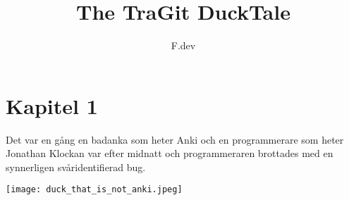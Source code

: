 \documentclass[a4paper]{article}
\begin{document}
\title{The TraGit DuckTale}
\author{F.dev}
\maketitle

\section*{Kapitel 1}
Det var en gång en badanka som heter Anki och en programmerare som heter Jonathan
Klockan var efter midnatt och programmeraren brottades med en synnerligen svåridentifierad bug.

\begin{center}
	\texttt{[image: duck\_that\_is\_not\_anki.jpeg]}
\end{center}


\end{document}
